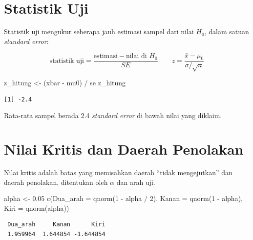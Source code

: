 \documentclass[
  indonesian,
  letterpaper,
]{book}
\newenvironment{Shaded}{\begin{snugshade}}{\end{snugshade}}
\newcommand{\AttributeTok}[1]{\textcolor[rgb]{0.40,0.45,0.13}{#1}}
\newcommand{\DecValTok}[1]{\textcolor[rgb]{0.68,0.00,0.00}{#1}}
\newcommand{\FloatTok}[1]{\textcolor[rgb]{0.68,0.00,0.00}{#1}}
\newcommand{\FunctionTok}[1]{\textcolor[rgb]{0.28,0.35,0.67}{#1}}
\newcommand{\NormalTok}[1]{\textcolor[rgb]{0.00,0.23,0.31}{#1}}
\newcommand{\OtherTok}[1]{\textcolor[rgb]{0.00,0.23,0.31}{#1}}
\newcommand{\SpecialCharTok}[1]{\textcolor[rgb]{0.37,0.37,0.37}{#1}}
\begin{document}
\section{Statistik Uji}\label{statistik-uji}

Statistik uji mengukur seberapa jauh estimasi sampel dari nilai \(H_0\),
dalam satuan \emph{standard error}:

\[
\text{statistik uji} = \frac{\text{estimasi} - \text{nilai di } H_0}{SE}
\qquad
z = \frac{\bar{x} - \mu_0}{\sigma / \sqrt{n}}
\]

\begin{Shaded}
\begin{Highlighting}[]
\NormalTok{z\_hitung }\OtherTok{\textless{}{-}}\NormalTok{ (xbar }\SpecialCharTok{{-}}\NormalTok{ mu0) }\SpecialCharTok{/}\NormalTok{ se}
\NormalTok{z\_hitung}
\end{Highlighting}
\end{Shaded}

\begin{verbatim}
[1] -2.4
\end{verbatim}

Rata-rata sampel berada 2.4 \emph{standard error} di bawah nilai yang
diklaim.

\section{Nilai Kritis dan Daerah
Penolakan}\label{nilai-kritis-dan-daerah-penolakan}

Nilai kritis adalah batas yang memisahkan daerah ``tidak mengejutkan''
dan daerah penolakan, ditentukan oleh \(\alpha\) dan arah uji.

\begin{Shaded}
\begin{Highlighting}[]
\NormalTok{alpha }\OtherTok{\textless{}{-}} \FloatTok{0.05}
\FunctionTok{c}\NormalTok{(}\AttributeTok{Dua\_arah =} \FunctionTok{qnorm}\NormalTok{(}\DecValTok{1} \SpecialCharTok{{-}}\NormalTok{ alpha }\SpecialCharTok{/} \DecValTok{2}\NormalTok{), }\AttributeTok{Kanan =} \FunctionTok{qnorm}\NormalTok{(}\DecValTok{1} \SpecialCharTok{{-}}\NormalTok{ alpha), }\AttributeTok{Kiri =} \FunctionTok{qnorm}\NormalTok{(alpha))}
\end{Highlighting}
\end{Shaded}

\begin{verbatim}
 Dua_arah     Kanan      Kiri 
 1.959964  1.644854 -1.644854 
\end{verbatim}
\end{document}

